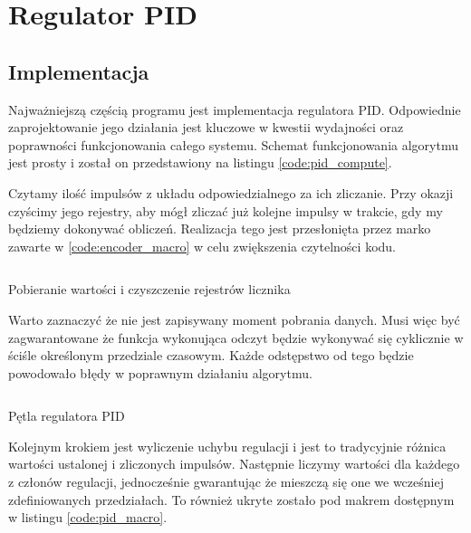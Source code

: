    \section{Regulator PID} 
    
    \subsection{Implementacja}
         Najważniejszą częścią programu jest implementacja regulatora PID. Odpowiednie zaprojektowanie jego działania jest kluczowe w kwestii wydajności oraz poprawności funkcjonowania całego systemu. Schemat funkcjonowania algorytmu jest prosty i został on przedstawiony na listingu \ref{code:pid_compute}.
         
         Czytamy ilość impulsów z układu odpowiedzialnego za ich zliczanie. Przy okazji czyścimy jego rejestry, aby mógł zliczać już kolejne impulsy w trakcie, gdy my będziemy dokonywać obliczeń. Realizacja tego jest przesłonięta przez marko zawarte w \ref{code:encoder_macro} w celu zwiększenia czytelności kodu. 
         
        \begin{kod}
          \inputminted[firstline=10,lastline=12]{cpp}{esp/listings/encoder_driver.hpp}
          \caption{Pobieranie wartości i czyszczenie rejestrów licznika}
          \label{code:encoder_macro}
          \vspace{1em}
        \end{kod}
         
         
         Warto zaznaczyć że nie jest zapisywany moment pobrania danych. Musi więc być zagwarantowane że funkcja wykonująca odczyt będzie wykonywać się cyklicznie w ściśle określonym przedziale czasowym. Każde odstępstwo od tego będzie powodowało błędy w poprawnym działaniu algorytmu. 
         
        \begin{kod}
          \inputminted[firstline=17,lastline=45]{cpp}{esp/listings/pid.cpp}
          \caption{Pętla regulatora PID}
          \label{code:pid_compute}
          \vspace{2em}
        \end{kod}
    
         Kolejnym krokiem jest wyliczenie uchybu regulacji i jest to tradycyjnie różnica wartości ustalonej i zliczonych impulsów. Następnie liczymy wartości dla każdego z członów regulacji, jednocześnie gwarantując że mieszczą się one we wcześniej zdefiniowanych przedziałach. To również ukryte zostało pod makrem dostępnym w listingu \ref{code:pid_macro}.
         
